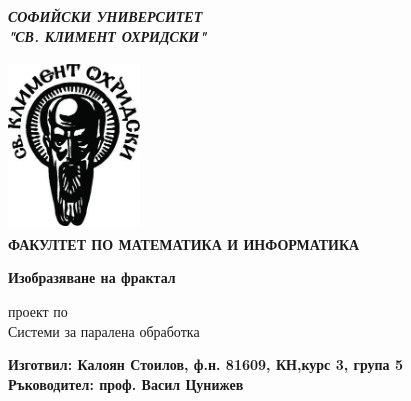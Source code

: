 \begin{titlepage}
   \begin{center}
   \begin{Large}
   \textbf{\textit{СОФИЙСКИ УНИВЕРСИТЕТ \\ "СВ. КЛИМЕНТ ОХРИДСКИ"}}

   \end{Large}

   	\includegraphics[width=3.5cm,height=4.5cm]{logo_su_s_nadpis_imagelarge}
   	\\
   	{\Large \textbf{ФАКУЛТЕТ ПО МАТЕМАТИКА И ИНФОРМАТИКА}}
   	\\
       \vspace*{3cm}
	\begin{Huge}
       \textbf{Изобразяване на фрактал}
       \\
	\end{Huge}
	\vspace{0.5cm}
	\begin{Large}
	проект по \\ Системи за паралена обработка
	\end{Large}
      \end{center}
       \vspace{3.5cm}

		\begin{flushleft}
		\begin{Large}
		\textbf{Изготвил: Калоян Стоилов, ф.н. 81609, КН,курс 3, група 5}\\
		\vspace{1cm}
		\textbf{Ръководител: проф. Васил Цунижев}
    \vspace{1cm}
		\end{Large}
		\end{flushleft}
    \begin{center}
      \begin{LARGE}
      \end{LARGE}
    \end{center}

       \vfill

\end{titlepage}
